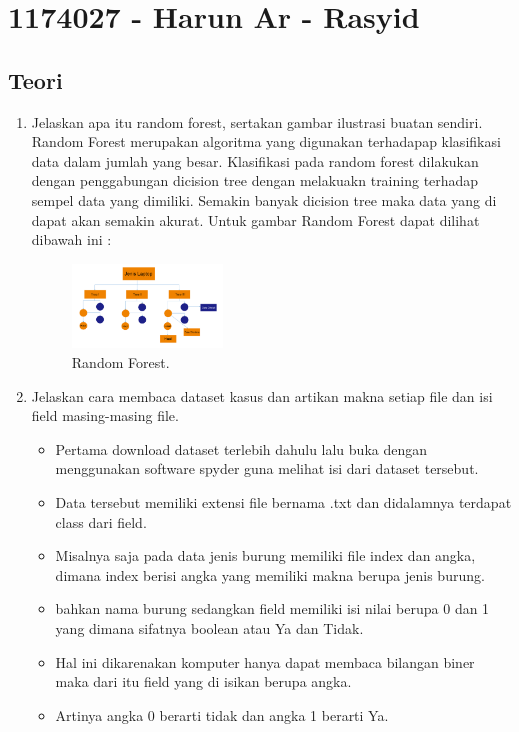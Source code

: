 \section{1174027 - Harun Ar - Rasyid}
\subsection{Teori}
\begin{enumerate}
	\item Jelaskan apa itu random forest, sertakan gambar ilustrasi buatan sendiri.
	\hfill\break
	Random Forest merupakan algoritma yang digunakan terhadapap klasifikasi data dalam jumlah yang besar. Klasifikasi pada random forest dilakukan dengan penggabungan dicision tree dengan melakuakn training terhadap sempel data yang dimiliki. Semakin banyak dicision tree maka data yang di dapat akan semakin akurat. Untuk gambar Random Forest dapat dilihat dibawah ini :
	\begin{figure}[H]
	\centering
		\includegraphics[width=4cm]{figures/1174027/3/1.png}
		\caption{Random Forest.}
	\end{figure}
	\item Jelaskan cara membaca dataset kasus dan artikan makna setiap file dan isi field masing-masing file.
	\hfill\break
	\begin{itemize}
		\item Pertama download dataset terlebih dahulu lalu buka dengan menggunakan software spyder guna melihat isi dari dataset tersebut.
		\item Data tersebut memiliki extensi file bernama .txt dan didalamnya terdapat class dari field.
		\item Misalnya saja pada data jenis burung memiliki file index dan angka, dimana index berisi angka yang memiliki makna berupa jenis burung.
		\item bahkan nama burung sedangkan field memiliki isi nilai berupa 0 dan 1 yang dimana sifatnya boolean atau Ya dan Tidak.
		\item Hal ini dikarenakan komputer hanya dapat membaca bilangan biner maka dari itu field yang di isikan berupa angka.
		\item Artinya angka 0 berarti tidak dan angka 1 berarti Ya.
	\end{itemize}

\end{enumerate}
